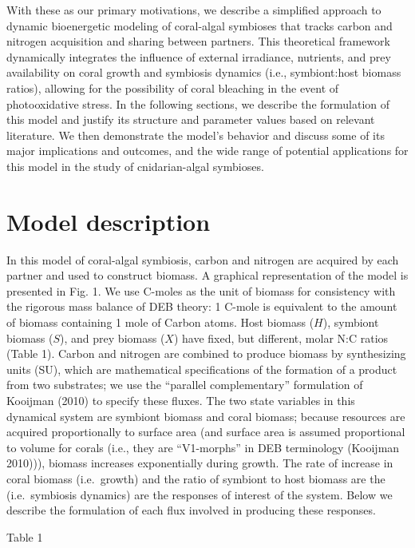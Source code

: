 \documentclass[]{elsarticle} %
\begin{document}
With these as our primary motivations, we describe a simplified approach
to dynamic bioenergetic modeling of coral-algal symbioses that tracks
carbon and nitrogen acquisition and sharing between partners. This
theoretical framework dynamically integrates the influence of external
irradiance, nutrients, and prey availability on coral growth and
symbiosis dynamics (i.e., symbiont:host biomass ratios), allowing for
the possibility of coral bleaching in the event of photooxidative
stress. In the following sections, we describe the formulation of this
model and justify its structure and parameter values based on relevant
literature. We then demonstrate the model's behavior and discuss some of
its major implications and outcomes, and the wide range of potential
applications for this model in the study of cnidarian-algal symbioses.

\section{Model description}\label{model-description}

In this model of coral-algal symbiosis, carbon and nitrogen are acquired
by each partner and used to construct biomass. A graphical
representation of the model is presented in Fig. 1. We use C-moles as
the unit of biomass for consistency with the rigorous mass balance of
DEB theory: 1 C-mole is equivalent to the amount of biomass containing 1
mole of Carbon atoms. Host biomass (\(H\)), symbiont biomass (\(S\)),
and prey biomass (\(X\)) have fixed, but different, molar N:C ratios
(Table 1). Carbon and nitrogen are combined to produce biomass by
synthesizing units (SU), which are mathematical specifications of the
formation of a product from two substrates; we use the ``parallel
complementary'' formulation of Kooijman (2010) to specify these fluxes.
The two state variables in this dynamical system are symbiont biomass
and coral biomass; because resources are acquired proportionally to
surface area (and surface area is assumed proportional to volume for
corals (i.e., they are ``V1-morphs'' in DEB terminology (Kooijman
2010))), biomass increases exponentially during growth. The rate of
increase in coral biomass (i.e.~growth) and the ratio of symbiont to
host biomass are the (i.e.~symbiosis dynamics) are the responses of
interest of the system. Below we describe the formulation of each flux
involved in producing these responses.

Table 1
\end{document}
